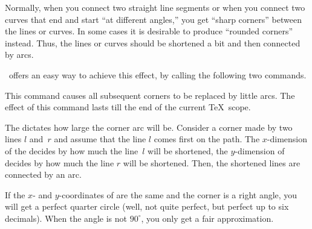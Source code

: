 Normally, when you connect two straight line segments or when you
connect two curves that end and start ``at different angles,'' you get
``sharp corners'' between the lines or curves. In some cases it is
desirable to produce ``rounded corners'' instead. Thus, the lines
or curves should be shortened a bit and then connected by arcs.

\pgfname\ offers an easy way to achieve this effect, by calling the
following two commands.

\begin{command}{\pgfsetcornersarced{}}
  This command causes all subsequent corners to be replaced by little
  arcs. The effect of this command lasts till the end of the current
  \TeX\ scope.

  The  dictates how large the corner arc will be. Consider
  a corner made by two lines $l$ and~$r$ and assume that the line $l$
  comes first on the path. The $x$-dimension of the 
  decides by how much the line~$l$ will be shortened, the
  $y$-dimension of  decides by how much the line $r$ will
  be shortened. Then, the shortened lines are connected by an arc.

\begin{codeexample}[]
\end{codeexample}

\begin{codeexample}[]
\end{codeexample}

  If the $x$- and $y$-coordinates of  are the same and the
  corner is a right angle, you will get a perfect quarter circle
  (well, not quite perfect, but perfect up to six decimals). When the
  angle is not $90^\circ$, you only get a fair approximation.


\end{command}
